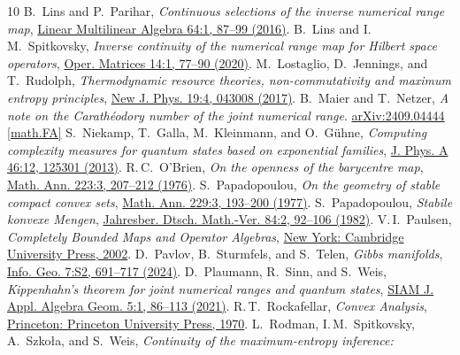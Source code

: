 \documentclass[a4paper,11pt,reqno]{amsart}
\theoremstyle{definition}
\theoremstyle{remark}
\numberwithin{equation}{section}
\begin{document}
\begin{thebibliography}{10}
%
B.~Lins and P.~Parihar, 
\emph{Continuous selections of the inverse numerical range map},
\href{https://doi.org/10.1080/03081087.2015.1043717}%
{Linear Multilinear Algebra 64:1, 87--99 (2016)}.
%
B.~Lins and I.\,M.~Spitkovsky, 
\emph{Inverse continuity of the numerical range map for Hilbert space operators},
\href{https://doi.org/10.7153/oam-2020-14-06}%
{Oper. Matrices 14:1, 77--90 (2020)}.
%
M.~Lostaglio, D.~Jennings, and T.~Rudolph, 
\emph{Thermodynamic resource theories, 
non-commutativity and maximum entropy principles},
\href{https://doi.org/10.1088/1367-2630/aa617f}%
{New J. Phys. 19:4, 043008 (2017)}.
%
B.~Maier and T.~Netzer, 
\emph{A note on the Carath\'{e}odory number of the joint numerical range}.
\href{https://doi.org/10.48550/arXiv.2409.04444}%
{arXiv:2409.04444 [math.FA]}
%
S.~Niekamp, T.~Galla, M.~Kleinmann, and O.~G\"{u}hne,
\emph{Computing complexity measures for quantum states based on exponential families},
\href{https://doi.org/10.1088/1751-8113/46/12/125301}%
{J. Phys. A 46:12, 125301 (2013)}.
%
R.\,C.~O'Brien,
\emph{On the openness of the barycentre map},
\href{https://doi.org/10.1007/BF01360953}%
{Math. Ann. 223:3, 207--212 (1976)}.
%
S.~Papadopoulou, 
\emph{On the geometry of stable compact convex sets},
\href{https://doi.org/10.1007/BF01391464}%
{Math. Ann. 229:3, 193--200 (1977)}.
%
S.~Papadopoulou, 
\emph{Stabile konvexe Mengen}, 
\href{https://www.math.uni-bielefeld.de/jb_dmv/JB_DMV_084_2.pdf}%
{Jahresber. Dtsch. Math.-Ver. 84:2, 92--106 (1982)}.
%
V.\,I.~Paulsen, 
\emph{Completely Bounded Maps and Operator Algebras},
\href{https://doi.org/10.1017/CBO9780511546631}%
{New York: Cambridge University Press, 2002}.
%
D.~Pavlov, B.~Sturmfels, and S.~Telen, 
\emph{Gibbs manifolds},
\href{https://doi.org/10.1007/s41884-023-00111-2}%
{Info. Geo. 7:S2, 691--717 (2024)}.
%
D.~Plaumann, R.~Sinn, and S.~Weis,
\emph{Kippenhahn's theorem for joint numerical ranges and quantum states},
\href{https://doi.org/10.1137/19M1286578}%
{SIAM J. Appl. Algebra Geom. 5:1, 86--113 (2021)}.
%
R.\,T.~Rockafellar, 
\emph{Convex Analysis},
\href{https://doi.org/10.1515/9781400873173}%
{Princeton: Princeton University Press, 1970}.
%
L.~Rodman, I.\,M.~Spitkovsky, A.~Szko{\l}a, and S.~Weis,
\emph{Continuity of the maximum-entropy inference: 
}
\end{thebibliography}
\end{document}
